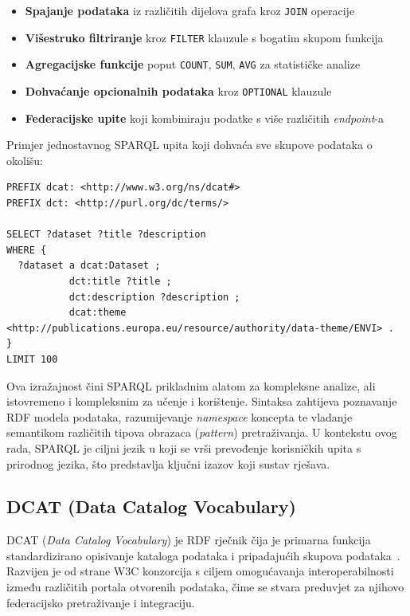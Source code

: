 \begin{itemize}
    \item \textbf{Spajanje podataka} iz različitih dijelova grafa kroz \texttt{JOIN} operacije
    \item \textbf{Višestruko filtriranje} kroz \texttt{FILTER} klauzule s bogatim skupom funkcija
    \item \textbf{Agregacijske funkcije} poput \texttt{COUNT}, \texttt{SUM}, \texttt{AVG} za statističke analize
    \item \textbf{Dohvaćanje opcionalnih podataka} kroz \texttt{OPTIONAL} klauzule
    \item \textbf{Federacijske upite} koji kombiniraju podatke s više različitih \textit{endpoint}-a
\end{itemize}

Primjer jednostavnog SPARQL upita koji dohvaća sve skupove podataka o okolišu:

\begin{lstlisting}[language=SPARQL, caption=Primjer SPARQL upita za dohvaćanje skupova podataka o okolišu]
PREFIX dcat: <http://www.w3.org/ns/dcat#>
PREFIX dct: <http://purl.org/dc/terms/>

SELECT ?dataset ?title ?description
WHERE {
  ?dataset a dcat:Dataset ;
           dct:title ?title ;
           dct:description ?description ;
           dcat:theme <http://publications.europa.eu/resource/authority/data-theme/ENVI> .
}
LIMIT 100
\end{lstlisting}

Ova izražajnost čini SPARQL prikladnim alatom za kompleksne analize, ali istovremeno i kompleksnim za učenje i korištenje. Sintaksa zahtijeva poznavanje RDF modela podataka, razumijevanje \textit{namespace} koncepta te vladanje semantikom različitih tipova obrazaca (\textit{pattern}) pretraživanja. U kontekstu ovog rada, SPARQL je ciljni jezik u koji se vrši prevođenje korisničkih upita s prirodnog jezika, što predstavlja ključni izazov koji sustav rješava.

\subsection{DCAT (Data Catalog Vocabulary)}

DCAT (\textit{Data Catalog Vocabulary}) je RDF rječnik čija je primarna funkcija standardizirano opisivanje kataloga podataka i pripadajućih skupova podataka~\cite{dcat2020}. Razvijen je od strane W3C konzorcija s ciljem omogućavanja interoperabilnosti između različitih portala otvorenih podataka, čime se stvara preduvjet za njihovo federacijsko pretraživanje i integraciju.

